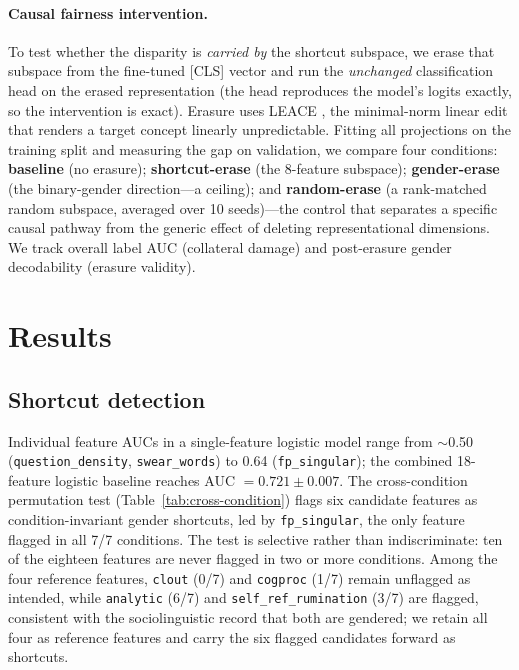 \documentclass[11pt]{article}
\begin{document}
\paragraph{Causal fairness intervention.}
To test whether the disparity is \emph{carried by} the shortcut subspace, we erase that subspace from the fine-tuned [CLS] vector and run the \emph{unchanged} classification head on the erased representation (the head reproduces the model's logits exactly, so the intervention is exact). Erasure uses LEACE \citep{belrose2023leace}, the minimal-norm linear edit that renders a target concept linearly unpredictable. Fitting all projections on the training split and measuring the gap on validation, we compare four conditions: \textbf{baseline} (no erasure); \textbf{shortcut-erase} (the 8-feature subspace); \textbf{gender-erase} (the binary-gender direction---a ceiling); and \textbf{random-erase} (a rank-matched random subspace, averaged over 10 seeds)---the control that separates a specific causal pathway from the generic effect of deleting representational dimensions. We track overall label AUC (collateral damage) and post-erasure gender decodability (erasure validity).

\section{Results}
\label{sec:results}

\subsection{Shortcut detection}

Individual feature AUCs in a single-feature logistic model range from $\sim$0.50 (\texttt{question\_density}, \texttt{swear\_words}) to 0.64 (\texttt{fp\_singular}); the combined 18-feature logistic baseline reaches AUC $= 0.721 \pm 0.007$. The cross-condition permutation test (Table~\ref{tab:cross-condition}) flags six candidate features as condition-invariant gender shortcuts, led by \texttt{fp\_singular}, the only feature flagged in all 7/7 conditions. The test is selective rather than indiscriminate: ten of the eighteen features are never flagged in two or more conditions. Among the four reference features, \texttt{clout} (0/7) and \texttt{cogproc} (1/7) remain unflagged as intended, while \texttt{analytic} (6/7) and \texttt{self\_ref\_rumination} (3/7) are flagged, consistent with the sociolinguistic record that both are gendered; we retain all four as reference features and carry the six flagged candidates forward as shortcuts.
\end{document}
